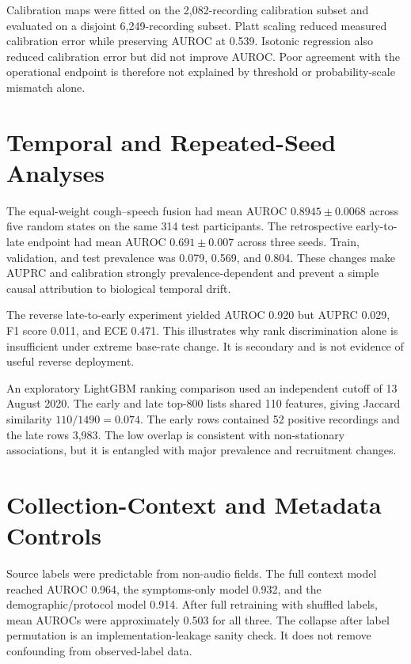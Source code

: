 \documentclass[journal]{IEEEtran}
\begin{document}
Calibration maps were fitted on the 2,082-recording calibration subset and evaluated on a disjoint 6,249-recording subset. Platt scaling reduced measured calibration error while preserving AUROC at 0.539. Isotonic regression also reduced calibration error but did not improve AUROC. Poor agreement with the operational endpoint is therefore not explained by threshold or probability-scale mismatch alone.

\section{Temporal and Repeated-Seed Analyses}

The equal-weight cough--speech fusion had mean AUROC $0.8945\pm0.0068$ across five random states on the same 314 test participants. The retrospective early-to-late endpoint had mean AUROC $0.691\pm0.007$ across three seeds. Train, validation, and test prevalence was 0.079, 0.569, and 0.804. These changes make AUPRC and calibration strongly prevalence-dependent and prevent a simple causal attribution to biological temporal drift.

The reverse late-to-early experiment yielded AUROC 0.920 but AUPRC 0.029, F1 score 0.011, and ECE 0.471. This illustrates why rank discrimination alone is insufficient under extreme base-rate change. It is secondary and is not evidence of useful reverse deployment.

An exploratory LightGBM ranking comparison used an independent cutoff of 13 August 2020. The early and late top-800 lists shared 110 features, giving Jaccard similarity $110/1490=0.074$. The early rows contained 52 positive recordings and the late rows 3,983. The low overlap is consistent with non-stationary associations, but it is entangled with major prevalence and recruitment changes.

\section{Collection-Context and Metadata Controls}

Source labels were predictable from non-audio fields. The full context model reached AUROC 0.964, the symptoms-only model 0.932, and the demographic/protocol model 0.914. After full retraining with shuffled labels, mean AUROCs were approximately 0.503 for all three. The collapse after label permutation is an implementation-leakage sanity check. It does not remove confounding from observed-label data.
\end{document}
